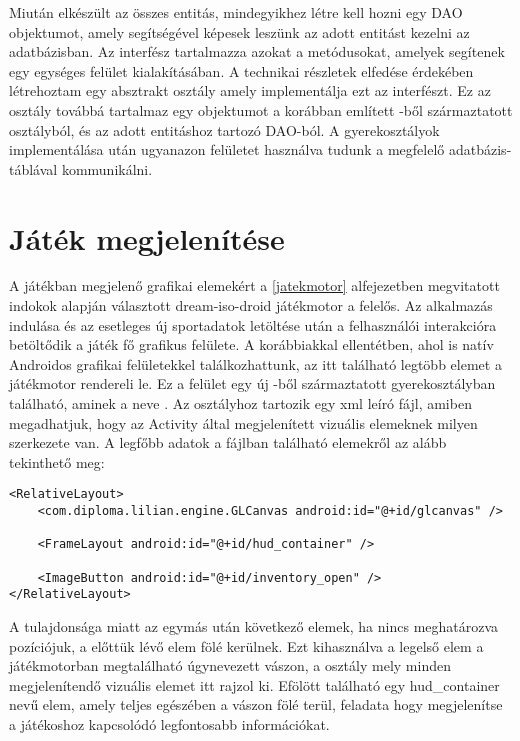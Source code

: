 Miután elkészült az összes entitás, mindegyikhez létre kell hozni egy DAO objektumot, amely segítségével képesek leszünk az adott entitást kezelni az adatbázisban. 
Az  interfész tartalmazza azokat a metódusokat, amelyek segítenek egy egységes felület kialakításában. 
A technikai részletek elfedése érdekében létrehoztam egy absztrakt  osztály amely implementálja ezt az interfészt. 
Ez az osztály továbbá tartalmaz egy objektumot a korábban említett -ből származtatott osztályból, és az adott entitáshoz tartozó DAO-ból.
A gyerekosztályok implementálása után ugyanazon felületet használva tudunk a megfelelő adatbázis-táblával kommunikálni. 

\section{Játék megjelenítése}
\label{megjelenites}

A játékban megjelenő grafikai elemekért a \ref{jatekmotor} alfejezetben megvitatott indokok alapján választott dream-iso-droid játékmotor a felelős. 
Az alkalmazás indulása és az esetleges új sportadatok letöltése után a felhasználói interakcióra betöltődik a játék fő grafikus felülete. 
A korábbiakkal ellentétben, ahol is natív Androidos grafikai felületekkel találkozhattunk, az itt található legtöbb elemet a játékmotor rendereli le. 
Ez a felület egy új -ből származtatott gyerekosztályban található, aminek a neve . 
Az osztályhoz tartozik egy xml leíró fájl, amiben megadhatjuk, hogy az Activity által megjelenített vizuális elemeknek milyen szerkezete van. 
A legfőbb adatok a fájlban található elemekről az alább tekinthető meg:

\begin{lstlisting}
<RelativeLayout>
    <com.diploma.lilian.engine.GLCanvas android:id="@+id/glcanvas" />

    <FrameLayout android:id="@+id/hud_container" />

    <ImageButton android:id="@+id/inventory_open" />
</RelativeLayout>
\end{lstlisting}

A  tulajdonsága miatt az egymás után következő elemek, ha nincs meghatározva pozíciójuk, a előttük lévő elem fölé kerülnek. 
Ezt kihasználva a legelső elem a játékmotorban megtalálható úgynevezett vászon, a  osztály mely minden megjelenítendő vizuális elemet itt rajzol ki. 
Efölött található egy hud\_container nevű elem, amely teljes egészében a vászon fölé terül, feladata hogy megjelenítse a játékoshoz kapcsolódó legfontosabb információkat.

